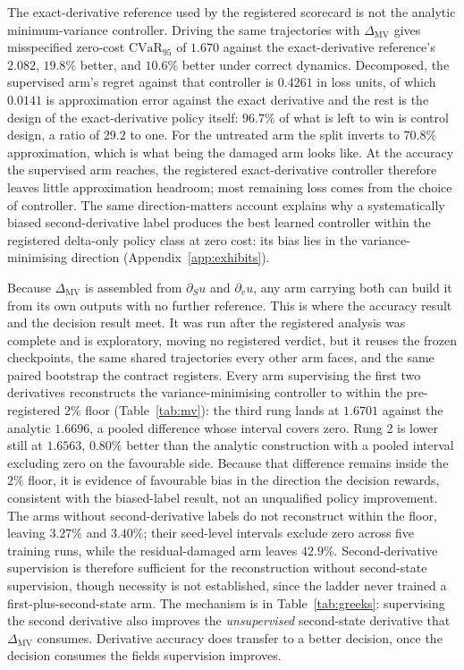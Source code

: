 \documentclass{article}
\begin{document}
The exact-derivative reference used by the registered scorecard is not the
analytic minimum-variance controller.
Driving the same trajectories with $\Delta_{\mathrm{MV}}$ gives misspecified
zero-cost $\mathrm{CVaR}_{95}$ of $1.670$ against the exact-derivative reference's
$2.082$, $19.8\%$ better, and $10.6\%$ better under correct dynamics. Decomposed,
the supervised arm's regret against that controller is $0.4261$ in loss units, of
which $0.0141$ is approximation error against the exact derivative and the rest is
the design of the exact-derivative policy itself: $96.7\%$ of what is left to win is
control design, a ratio of $29.2$ to one. For the untreated arm the split inverts to
$70.8\%$ approximation, which is what being the damaged arm looks like. At the
accuracy the supervised arm reaches, the registered exact-derivative controller
therefore leaves little approximation headroom; most remaining loss comes from the
choice of controller. The same direction-matters account explains why a
systematically biased second-derivative label produces the best learned controller
within the registered delta-only policy class at zero cost: its bias lies in the
variance-minimising direction (Appendix~\ref{app:exhibits}).

Because $\Delta_{\mathrm{MV}}$ is assembled from $\partial_S u$ and $\partial_v u$,
any arm carrying both can build it from its own outputs with no further reference.
This is where the accuracy result and the decision result meet. It was run after the
registered analysis was complete and is exploratory, moving no registered verdict,
but it reuses the frozen checkpoints, the same shared trajectories every other arm
faces, and the same paired bootstrap the contract registers. Every arm supervising
the first two derivatives reconstructs the variance-minimising controller to within
the pre-registered $2\%$ floor (Table~\ref{tab:mv}): the third rung lands at
$1.6701$ against the analytic $1.6696$, a pooled difference whose interval covers
zero. Rung 2 is lower still at $1.6563$, $0.80\%$ better than the analytic
construction with a pooled interval excluding zero on the favourable side. Because
that difference remains inside the $2\%$ floor, it is evidence of favourable bias
in the direction the decision rewards, consistent with the biased-label result,
not an unqualified policy improvement. The arms without second-derivative labels
do not reconstruct within the floor, leaving $3.27\%$ and $3.40\%$; their
seed-level intervals exclude zero across five training runs, while the
residual-damaged arm leaves $42.9\%$. Second-derivative supervision is therefore sufficient for the
reconstruction without second-state supervision, though necessity is not
established, since the ladder never trained a first-plus-second-state arm. The
mechanism is in Table~\ref{tab:greeks}: supervising the second derivative also
improves the \emph{unsupervised} second-state derivative that $\Delta_{\mathrm{MV}}$
consumes. Derivative accuracy does transfer to a better decision, once the decision
consumes the fields supervision improves.
\end{document}
